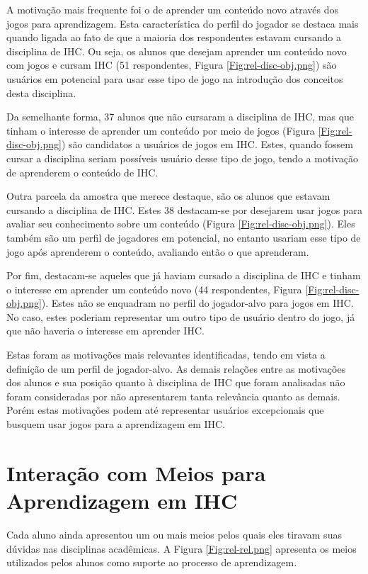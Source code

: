 A motivação mais frequente foi o de aprender um conteúdo novo através dos jogos para aprendizagem. Esta característica do perfil do jogador se destaca mais quando ligada ao fato de que a maioria dos respondentes estavam cursando a disciplina de IHC. Ou seja, os alunos que desejam aprender um conteúdo novo com jogos e cursam IHC (51 respondentes, Figura \ref{Fig:rel-disc-obj.png}) são usuários em potencial para usar esse tipo de jogo na introdução dos conceitos desta disciplina. 

Da semelhante forma, 37 alunos que não cursaram a disciplina de IHC, mas que tinham o interesse de aprender um conteúdo por meio de jogos (Figura \ref{Fig:rel-disc-obj.png}) são candidatos a usuários de jogos em IHC. Estes, quando fossem cursar a disciplina seriam possíveis usuário desse tipo de jogo, tendo a motivação de aprenderem o conteúdo de IHC.

Outra parcela da amostra que merece destaque, são os alunos que estavam cursando a disciplina de IHC. Estes 38 destacam-se por desejarem usar jogos para avaliar seu conhecimento sobre um conteúdo (Figura \ref{Fig:rel-disc-obj.png}). Eles também são um perfil de jogadores em potencial, no entanto usariam esse tipo de jogo após aprenderem o conteúdo, avaliando então o que aprenderam.

Por fim, destacam-se aqueles que já haviam cursado a disciplina de IHC e tinham o interesse em aprender um conteúdo novo (44 respondentes, Figura \ref{Fig:rel-disc-obj.png}). Estes não se enquadram no perfil do jogador-alvo para jogos em IHC. No caso, estes poderiam representar um outro tipo de usuário dentro do jogo, já que não haveria o interesse em aprender IHC. 

Estas foram as motivações mais relevantes identificadas, tendo em vista a definição de um perfil de jogador-alvo. As demais relações entre as motivações dos alunos e sua posição quanto à disciplina de IHC que foram analisadas não foram consideradas por não apresentarem tanta relevância quanto as demais. Porém estas motivações podem até representar usuários excepcionais que busquem usar jogos para a aprendizagem em IHC.

\section{Interação com Meios para Aprendizagem em IHC}

Cada aluno ainda apresentou um ou mais meios pelos quais eles tiravam suas dúvidas nas disciplinas acadêmicas. A Figura \ref{Fig:rel-rel.png} apresenta os meios utilizados pelos alunos como suporte ao processo de aprendizagem. 

